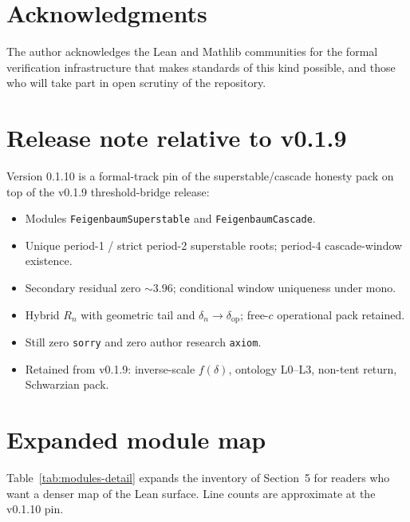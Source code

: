 \documentclass[11pt,a4paper]{article}
\newcommand{\deltaop}{\delta_{\mathrm{op}}}
\begin{document}
\section*{Acknowledgments}

The author acknowledges the Lean and Mathlib communities for the formal verification infrastructure that makes standards of this kind possible, and those who will take part in open scrutiny of the repository.

\appendix
\section{Release note relative to v0.1.9}
\label{app:changelog}

Version 0.1.10 is a formal-track pin of the superstable/cascade honesty pack on top of the
v0.1.9 threshold-bridge release:

\begin{itemize}[leftmargin=1.2em]
  \item Modules \texttt{FeigenbaumSuperstable} and \texttt{FeigenbaumCascade}.
  \item Unique period-1 / strict period-2 superstable roots; period-4 cascade-window existence.
  \item Secondary residual zero \(\sim 3.96\); conditional window uniqueness under mono.
  \item Hybrid \(R_n\) with geometric tail and \(\delta_n\to\deltaop\); free-\(c\) operational pack retained.
  \item Still zero \texttt{sorry} and zero author research \texttt{axiom}.
  \item Retained from v0.1.9: inverse-scale \(f(\delta)\), ontology L0--L3, non-tent return, Schwarzian pack.
\end{itemize}

\section{Expanded module map}
\label{app:modules}

Table~\ref{tab:modules-detail} expands the inventory of Section~5 for readers who want a denser map of the Lean surface. Line counts are approximate at the v0.1.10 pin.
\end{document}
